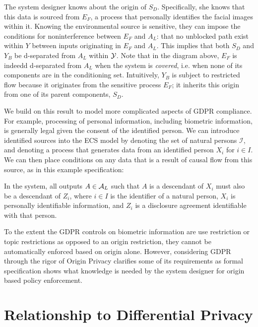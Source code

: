 \documentclass[../thesis.tex]{subfiles}
\begin{document}
The system designer knows about the origin of $S_D$.
Specifically, she knows that this data is sourced from $E_F$,
a process that personally identifies the facial images
within it.
Knowing the environmental source is sensitive,
they can impose the conditions for noninterference between
$E_F$ and $A_L$: that no unblocked path exist within $Y$ between
inputs originating in $E_F$ and $A_L$.
This implies that both $S_D$ and $Y_B$ be d-separated
from $A_L$ within $\mathcal{Y}$.
Note that in the diagram above, $E_F$ is indeedd d-separated
from $A_L$ when the system is \emph{covered}, i.e.
when none of its components are in the conditioning set.
Intuitively, $Y_B$ is subject to restricted flow because
it originates from the sensitive process $E_F$; it
inherits this origin from one of its parent components,
$S_D$.

We build on this result to model more complicated aspects
of GDPR compliance.
For example, processing of personal information, including
biometric information, is generally legal given the consent
of the identified person.
We can introduce identified sources into the ECS model
by denoting the set of natural persons $\mathcal{I}$,
and denoting a process that generates data from
an identified person $X_i$ for $i \in I$.
We can then place conditions on any data that is
a result of causal flow from this source, as
in this example specification:

\begin{exm}
In the system, all outputs $A \in \mathcal{A}_L$ such that
$A$ is a descendant of $X_i$ must also be a descendant
of $Z_i$, where $i \in I$ is the identifier of a natural person,
$X_i$ is personally identifiable information, and
$Z_i$ is a disclosure agreement identifiable with that person.
\end{exm}

To the extent the GDPR controls on biometric information are
use restriction or topic restrictions
as opposed to an origin restriction,
they cannot be automatically enforced based on origin alone.
However, considering GDPR through the rigor of Origin Privacy
clarifies some of its requirements as formal specification
shows what knowledge is needed by the system designer for
origin based policy enforcement.

\section{Relationship to Differential Privacy}
\label{sec:differential}
\end{document}

